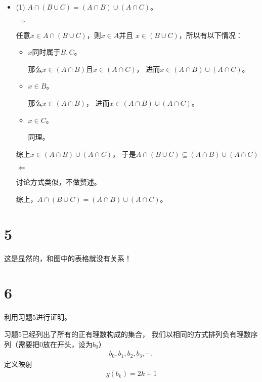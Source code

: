 \documentclass{article}
\begin{document}
\begin{itemize}
      \item (1) $A \cap (B \cup C) = (A \cap B) \cup (A \cap C)$。

            $\Rightarrow$

            任意$x \in A \cap (B \cup C)$，则$x \in A$并且
            $x \in (B \cup C)$，所以有以下情况：

            \begin{itemize}
                  \item $x$同时属于$B, C$。

                        那么$x \in (A \cap B)$且$x \in (A \cap C)$，
                        进而$x \in (A \cap B) \cup (A \cap C)$。

                  \item $x \in B$。

                        那么$x \in (A \cap B)$，
                        进而$x \in (A \cap B) \cup (A \cap C)$。

                  \item $x \in C$。

                        同理。

            \end{itemize}
            综上$x \in (A \cap B) \cup (A \cap C)$，
            于是$A \cap (B \cup C) \subseteq (A \cap B) \cup (A \cap C)$


            $\Leftarrow$

            讨论方式类似，不做赘述。

            综上，$A \cap (B \cup C) = (A \cap B) \cup (A \cap C)$。

\end{itemize}

\section*{5}

这是显然的，和图中的表格就没有关系！

\section*{6}

利用习题5进行证明。

习题5已经列出了所有的正有理数构成的集合，
我们以相同的方式排列负有理数序列（需要把$0$放在开头，设为$b_0$）
\begin{align*}
      b_0, b_1, b_2, b_3, \cdots,
\end{align*}
定义映射
\begin{align*}
      g(b_k) = 2k + 1
\end{align*}
\end{document}
